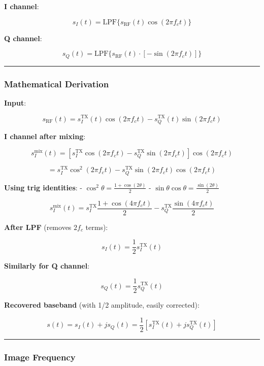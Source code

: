\textbf{I channel}:

\[
s_I(t) = \text{LPF}\{s_{\text{RF}}(t) \cos(2\pi f_c t)\}
\]

\textbf{Q channel}:

\[
s_Q(t) = \text{LPF}\{s_{\text{RF}}(t) \cdot [-\sin(2\pi f_c t)]\}
\]

\begin{center}\rule{0.5\linewidth}{0.5pt}\end{center}

\subsubsection{Mathematical Derivation}\label{mathematical-derivation}

\textbf{Input}:

\[
s_{\text{RF}}(t) = s_I^{\text{TX}}(t) \cos(2\pi f_c t) - s_Q^{\text{TX}}(t) \sin(2\pi f_c t)
\]

\textbf{I channel after mixing}:

\[
s_I^{\text{mix}}(t) = [s_I^{\text{TX}} \cos(2\pi f_c t) - s_Q^{\text{TX}} \sin(2\pi f_c t)] \cos(2\pi f_c t)
\]

\[
= s_I^{\text{TX}} \cos^2(2\pi f_c t) - s_Q^{\text{TX}} \sin(2\pi f_c t)\cos(2\pi f_c t)
\]

\textbf{Using trig identities}: -
\(\cos^2\theta = \frac{1 + \cos(2\theta)}{2}\) -
\(\sin\theta\cos\theta = \frac{\sin(2\theta)}{2}\)

\[
s_I^{\text{mix}}(t) = s_I^{\text{TX}} \frac{1 + \cos(4\pi f_c t)}{2} - s_Q^{\text{TX}} \frac{\sin(4\pi f_c t)}{2}
\]

\textbf{After LPF} (removes \(2f_c\) terms):

\[
s_I(t) = \frac{1}{2} s_I^{\text{TX}}(t)
\]

\textbf{Similarly for Q channel}:

\[
s_Q(t) = \frac{1}{2} s_Q^{\text{TX}}(t)
\]

\textbf{Recovered baseband} (with 1/2 amplitude, easily corrected):

\[
s(t) = s_I(t) + j s_Q(t) = \frac{1}{2}[s_I^{\text{TX}}(t) + j s_Q^{\text{TX}}(t)]
\]

\begin{center}\rule{0.5\linewidth}{0.5pt}\end{center}

\subsubsection{Image Frequency}\label{image-frequency}

